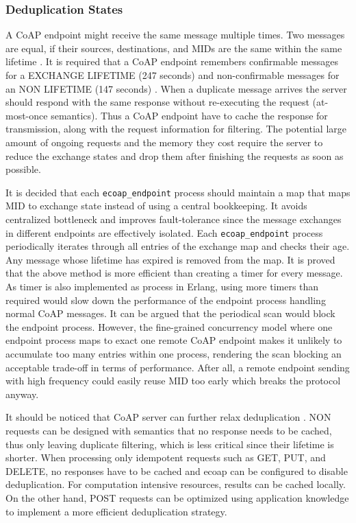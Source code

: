 \subsubsection{Deduplication States}

A CoAP endpoint might receive the same message multiple times. Two messages are equal, if their sources, destinations, and MIDs are the same within the same lifetime \cite{lanter2013scalability}. It is required that a CoAP endpoint remembers confirmable messages for a EXCHANGE LIFETIME (247 seconds) and non-confirmable messages for an NON LIFETIME (147 seconds) \cite{coap_protocol}. When a duplicate message arrives the server should respond with the same response without re-executing the request (at-most-once semantics). Thus a CoAP endpoint have to cache the response for transmission, along with the request information for filtering. The potential large amount of ongoing requests and the memory they cost require the server to reduce the exchange states and drop them after finishing the requests as soon as possible. 

It is decided that each \verb|ecoap_endpoint| process should maintain a map that maps MID to exchange state instead of using a central bookkeeping. It avoids centralized bottleneck and improves fault-tolerance since the message exchanges in different endpoints are effectively isolated. Each \verb|ecoap_endpoint| process periodically iterates through all entries of the exchange map and checks their age. Any message whose lifetime has expired is removed from the map. It is proved that the above method is more efficient than creating a timer for every message. As timer is also implemented as process in Erlang, using more timers than required would slow down the performance of the endpoint process handling normal CoAP messages. It can be argued that the periodical scan would block the endpoint process. However, the fine-grained concurrency model where one endpoint process maps to exact one remote CoAP endpoint makes it unlikely to accumulate too many entries within one process, rendering the scan blocking an acceptable trade-off in terms of performance. After all, a remote endpoint sending with high frequency could easily reuse MID too early which breaks the protocol anyway.

It should be noticed that CoAP server can further relax deduplication \cite{coap_protocol}. NON requests can be designed with semantics that no response needs to be cached, thus only leaving duplicate filtering, which is less critical since their lifetime is shorter. When processing only idempotent requests such as GET, PUT, and DELETE, no responses have to be cached and ecoap can be configured to disable deduplication. For computation intensive resources, results can be cached locally. On the other hand, POST requests can be optimized using application knowledge to implement a more efficient deduplication strategy. 

